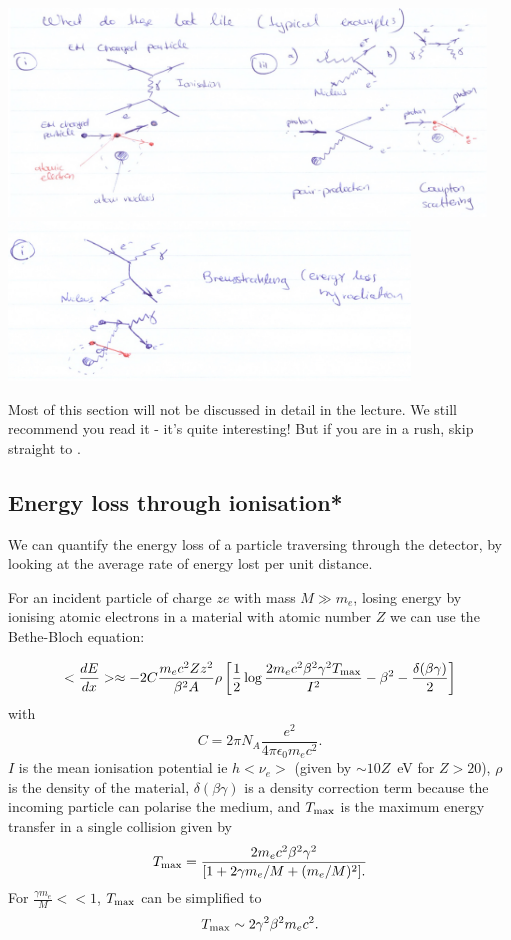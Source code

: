 \begin{center}
\includegraphics[width=0.95\textwidth]{fig/strongforce/matterinteractions/interactions1.jpg}\newline
\includegraphics[width=0.8\textwidth]{fig/strongforce/matterinteractions/interactions2.jpg}
\end{center}

Most of this section will not be discussed in detail in the lecture. We still recommend you read it - it's quite interesting! But if you are in a rush, skip straight to .

\subsection{Energy loss through ionisation*}
We can quantify the energy loss of a particle traversing through the detector, by looking at the average rate of energy lost per unit distance.


For an incident particle of charge $ze$ with mass $M\gg m_e$, losing energy by ionising atomic electrons in a material with atomic number $Z$ we can use the Bethe-Bloch equation:

\begin{equation}
\label{eq:bethebloch}
<\frac{dE}{dx}>\approx -2C\frac{m_ec^2Zz^2}{\beta^2A}\rho\left[\frac{1}{2}\log\frac{2m_ec^2\beta^2\gamma^2T_{\rm max}}{I^2}-\beta^2-\frac{\delta(\beta\gamma)}{2}\right]
\end{equation}
with \[C=2\pi N_A\frac{e^2}{4\pi\epsilon_0m_ec^2}.\] 
$I$ is the mean ionisation potential ie $h<\nu_e>$ (given by $\sim10Z$~eV for $Z>20$), $\rho$ is the density of the material, $\delta(\beta\gamma)$ is a density correction term because the incoming particle can polarise the medium, and $T_{\rm max}$ is the maximum energy transfer in a single collision given by
\[
T_{\rm max}=\frac{2m_ec^2\beta^2\gamma^2}{[1+2\gamma m_e/M +(m_e/M)^2].}
\]
For $\frac{\gamma m_e}{M}<<1$, $T_{\rm max}$ can be simplified to
\[
T_{\rm max}\sim2\gamma^2\beta^2m_ec^2.
\]

